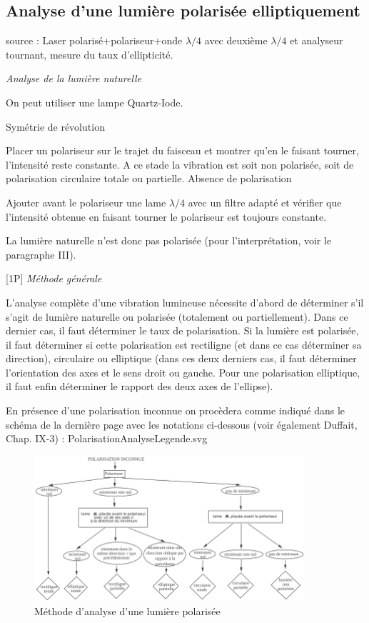 \documentclass{article}%
\begin{document}
\subsection{Analyse d'une lumière polarisée elliptiquement}
source : Laser polarisé+polariseur+onde $\lambda /4$
avec deuxième $\lambda /4$ et analyseur tournant, mesure du taux d'ellipticité.

\textit{Analyse de la lumière naturelle}

On peut utiliser une lampe Quartz-Iode.

Symétrie de révolution

Placer un polariseur sur le trajet du faisceau et montrer qu'en le faisant tourner, l'intensité reste constante. A ce stade la vibration est soit non polarisée, soit de polarisation circulaire totale ou partielle.
Absence de polarisation

Ajouter avant le polariseur une lame $\lambda / 4$ avec un filtre adapté et vérifier que l'intensité obtenue en faisant tourner le polariseur est toujours constante.

La lumière naturelle n'est donc pas polarisée (pour l'interprétation, voir le paragraphe III).


[1P] \textit{Méthode générale}

L'analyse complète d'une vibration lumineuse nécessite d'abord de déterminer s'il s'agit de lumière naturelle ou polarisée (totalement ou partiellement). Dans ce dernier cas, il faut déterminer le taux de polarisation. Si la lumière est polarisée, il faut déterminer si cette polarisation est rectiligne (et dans ce cas déterminer sa direction), circulaire ou elliptique (dans ces deux derniers cas, il faut déterminer l'orientation des axes et le sens droit ou gauche. Pour une polarisation elliptique, il faut enfin déterminer le rapport des deux axes de l'ellipse).

En présence d'une polarisation inconnue on procèdera comme indiqué dans le schéma de la dernière page avec les notations ci-dessous (voir également Duffait, Chap. IX-3) :
PolarisationAnalyseLegende.svg
\begin{figure}
	\centerline{\includegraphics[width=10cm]{images-exp/PolarisationSchemaAnalyse.png}}
	\caption{Méthode d'analyse d'une lumière polarisée}
\end{figure}
\end{document}
